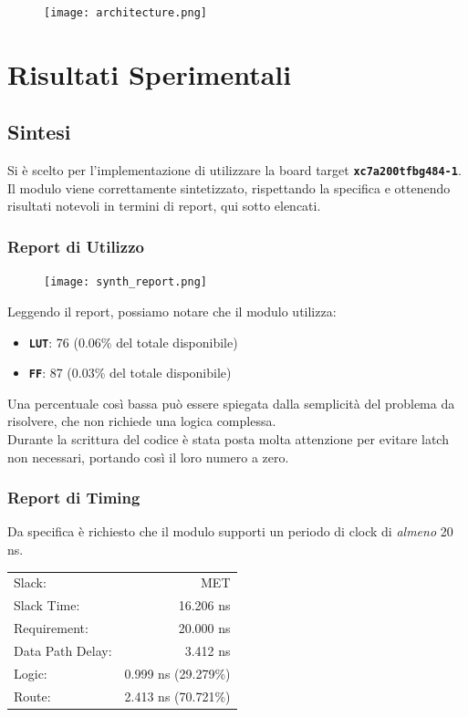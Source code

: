 \documentclass{article}
\begin{document}
\vspace{0.25cm}
\begin{figure}[h]
    \centering
    \texttt{[image: architecture.png]}
\end{figure}

\newpage
\section{Risultati Sperimentali}
\subsection{Sintesi}
Si è scelto per l'implementazione di utilizzare la board target \texttt{\textbf{xc7a200tfbg484-1}}. Il modulo viene correttamente sintetizzato, rispettando la specifica e ottenendo risultati notevoli in termini di report, qui sotto elencati.
\subsubsection{Report di Utilizzo}
\begin{figure}[h]
    \centering
    \texttt{[image: synth\_report.png]}
\end{figure}

Leggendo il report, possiamo notare che il modulo utilizza:
\begin{itemize}[label=\raisebox{0.25ex}{\tiny$\bullet$}]
    \item \texttt{\textbf{LUT}}: 76 (0.06\% del totale disponibile)
    \item \texttt{\textbf{FF}}: 87 (0.03\% del totale disponibile)
\end{itemize}

Una percentuale così bassa può essere spiegata dalla semplicità del problema da risolvere, che non richiede una logica complessa.
\smallskip \\ Durante la scrittura del codice è stata posta molta attenzione per evitare latch non necessari, portando così il loro numero a zero.

\subsubsection{Report di Timing}
Da specifica è richiesto che il modulo supporti un periodo di clock di \textit{almeno} 20 ns.

\begin{center}
    \begin{tabular}{l r}
        Slack: & MET \\
        Slack Time: & 16.206 ns \\
        Requirement: & 20.000 ns \\
        Data Path Delay: & 3.412 ns \\
        Logic: & 0.999 ns (29.279\%) \\
        Route: & 2.413 ns (70.721\%)
    \end{tabular}
\end{center}
\end{document}
